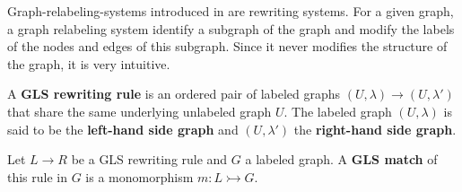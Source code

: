 Graph-relabeling-systems introduced in \cite{litovsky1999graph} are rewriting systems. For a given graph, a graph relabeling system identify a subgraph of the graph and modify the labels of the nodes and edges of this subgraph. Since it never modifies the structure of the graph, it is very intuitive.

\begin{definition}[Rule]
  \label{def:gls_rule}
  A \textbf{GLS rewriting rule} is an ordered pair of labeled graphs \( (U,\lambda) \to (U, \lambda') \) that share the same underlying unlabeled graph \( U \). The labeled graph \( (U, \lambda) \) is said to be the \textbf{left-hand side graph} and \( (U, \lambda')\) the \textbf{right-hand side graph}.
\end{definition} 
 
\begin{definition}[Match]
  \label{def:gls_match}
  Let \( L \to R \) be a GLS rewriting rule and \( G \) a labeled graph.
  A \textbf{GLS match} of this rule in \( G \) is a monomorphism \( m : L \rightarrowtail G \).
\end{definition}


